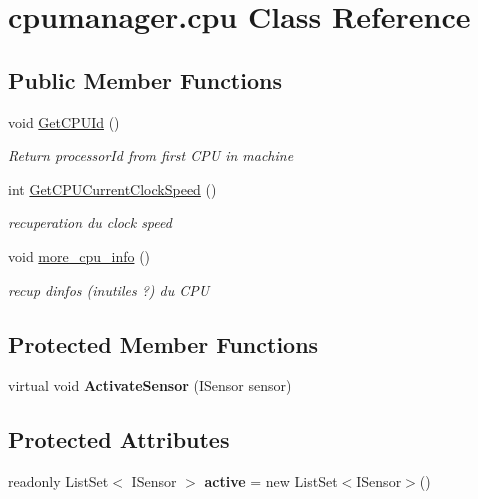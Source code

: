 \hypertarget{classcpumanager_1_1cpu}{}\section{cpumanager.\+cpu Class Reference}
\label{classcpumanager_1_1cpu}
\subsection*{Public Member Functions}
\begin{DoxyCompactItemize}
\item 
void \hyperlink{classcpumanager_1_1cpu_a644d7ec250526b11aae6325199d0d62d}{Get\+C\+P\+U\+Id} ()
\begin{DoxyCompactList}\small\item\em Return processor\+Id from first C\+PU in machine \end{DoxyCompactList}\item 
int \hyperlink{classcpumanager_1_1cpu_a90b14782baf800c618ee9f2ade46a632}{Get\+C\+P\+U\+Current\+Clock\+Speed} ()
\begin{DoxyCompactList}\small\item\em recuperation du clock speed \end{DoxyCompactList}\item 
void \hyperlink{classcpumanager_1_1cpu_ad87f0af47000b1dbfe37fda42d287434}{more\+\_\+cpu\+\_\+info} ()
\begin{DoxyCompactList}\small\item\em recup d\textquotesingle{}infos (inutiles ?) du C\+PU \end{DoxyCompactList}\end{DoxyCompactItemize}
\subsection*{Protected Member Functions}
\begin{DoxyCompactItemize}
\item 
\mbox{\label{classcpumanager_1_1cpu_a8aaad2abc0ddca470f7d347f2a31c4bf}} 
virtual void {\bfseries Activate\+Sensor} (I\+Sensor sensor)
\end{DoxyCompactItemize}
\subsection*{Protected Attributes}
\begin{DoxyCompactItemize}
\item 
\mbox{\label{classcpumanager_1_1cpu_a1e66692b2a33689311d624b589f5122a}} 
readonly List\+Set$<$ I\+Sensor $>$ {\bfseries active} = new List\+Set$<$I\+Sensor$>$()
\end{DoxyCompactItemize}
